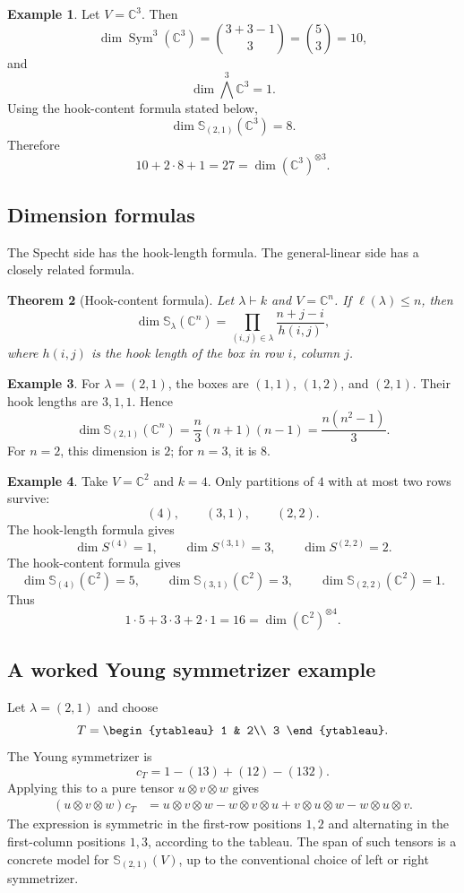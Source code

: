 \documentclass[12pt,a4paper]{article}
\newtheorem{theorem}{Theorem}[section]
\theoremstyle{definition}
\newtheorem{example}[theorem]{Example}
\theoremstyle{remark}
\newcommand{\C}{\mathbb{C}}
\newcommand{\Sym}{\operatorname{Sym}}
\newcommand{\Schur}[1]{\mathbb{S}_{#1}}
\begin{document}
\begin{example}
Let \(V=\C^3\).  Then
\[
\dim \Sym^3(\C^3)=\binom{3+3-1}{3}=\binom{5}{3}=10,
\]
and
\[
\dim \bigwedge^3\C^3=1.
\]
Using the hook-content formula stated below,
\[
\dim \Schur{(2,1)}(\C^3)=8.
\]
Therefore
\[
10+2\cdot 8+1=27=\dim(\C^3)^{\otimes 3}.
\]
\end{example}

\subsection{Dimension formulas}

The Specht side has the hook-length formula.  The general-linear side has a
closely related formula.

\begin{theorem}[Hook-content formula]
Let \(\lambda\vdash k\) and \(V=\C^n\).  If \(\ell(\lambda)\le n\), then
\[
\dim \Schur{\lambda}(\C^n)
  =
  \prod_{(i,j)\in \lambda}
  \frac{n+j-i}{h(i,j)},
\]
where \(h(i,j)\) is the hook length of the box in row \(i\), column \(j\).
\end{theorem}

\begin{example}
For \(\lambda=(2,1)\), the boxes are \((1,1)\), \((1,2)\), and \((2,1)\).
Their hook lengths are \(3,1,1\).  Hence
\[
\dim \Schur{(2,1)}(\C^n)
  =
  \frac{n}{3}(n+1)(n-1)
  =
  \frac{n(n^2-1)}{3}.
\]
For \(n=2\), this dimension is \(2\); for \(n=3\), it is \(8\).
\end{example}

\begin{example}
Take \(V=\C^2\) and \(k=4\).  Only partitions of \(4\) with at most two rows
survive:
\[
(4),\qquad (3,1),\qquad (2,2).
\]
The hook-length formula gives
\[
\dim S^{(4)}=1,\qquad
\dim S^{(3,1)}=3,\qquad
\dim S^{(2,2)}=2.
\]
The hook-content formula gives
\[
\dim \Schur{(4)}(\C^2)=5,\qquad
\dim \Schur{(3,1)}(\C^2)=3,\qquad
\dim \Schur{(2,2)}(\C^2)=1.
\]
Thus
\[
1\cdot 5+3\cdot 3+2\cdot 1=16=\dim(\C^2)^{\otimes 4}.
\]
\end{example}

\subsection{A worked Young symmetrizer example}

Let \(\lambda=(2,1)\) and choose
\[
T=
\begin{ytableau}
1 & 2\\
3
\end{ytableau}.
\]
The Young symmetrizer is
\[
c_T=1-(13)+(12)-(132).
\]
Applying this to a pure tensor \(u\otimes v\otimes w\) gives
\[
\begin{aligned}
(u\otimes v\otimes w)c_T
&=u\otimes v\otimes w
  -w\otimes v\otimes u
  +v\otimes u\otimes w
  -w\otimes u\otimes v.
\end{aligned}
\]
The expression is symmetric in the first-row positions \(1,2\) and
alternating in the first-column positions \(1,3\), according to the tableau.
The span of such tensors is a concrete model for
\(\Schur{(2,1)}(V)\), up to the conventional choice of left or right
symmetrizer.
\end{document}

